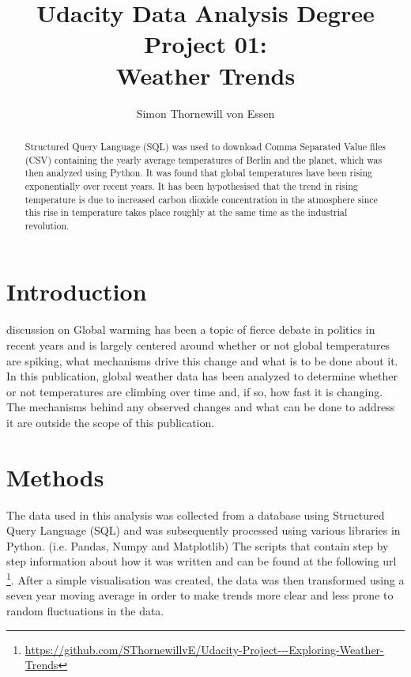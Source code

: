\documentclass[journal, a4paper]{IEEEtran}
\begin{document}
	\title{Udacity Data Analysis Degree Project 01: \\ Weather Trends}
	\author{Simon Thornewill von Essen}
	\maketitle

\begin{abstract}
	Structured Query Language (SQL)  was used to download Comma Separated Value files (CSV) containing the yearly average temperatures of Berlin and the planet, which was then analyzed using Python. It was found that global temperatures have been rising exponentially over recent years. It has been hypothesised that the trend in rising temperature is due to increased carbon dioxide concentration in the atmosphere since this rise in temperature takes place roughly at the same time as the industrial revolution.
\end{abstract}

\section{Introduction}
	 discussion on Global warming has been a topic of fierce debate in politics in recent years and is largely centered around whether or not global temperatures are spiking, what mechanisms drive this change and what is to be done about it. In this publication, global weather data has been analyzed to determine whether or not temperatures are climbing over time and, if so, how fast it is changing. The mechanisms behind any observed changes and what can be done to address it are outside the scope of this publication.

	\section{Methods}

    The data used in this analysis was collected from a database using Structured Query Language (SQL) and was subsequently processed using various libraries in Python. (i.e. Pandas, Numpy and Matplotlib) The scripts that contain step by step information about how it was written and can be found at the following url \footnote{\url{https://github.com/SThornewillvE/Udacity-Project---Exploring-Weather-Trends}}. After a simple visualisation was created, the data was then transformed using a seven year moving average in order to make trends more clear and less prone to random fluctuations in the data.
\end{document}
